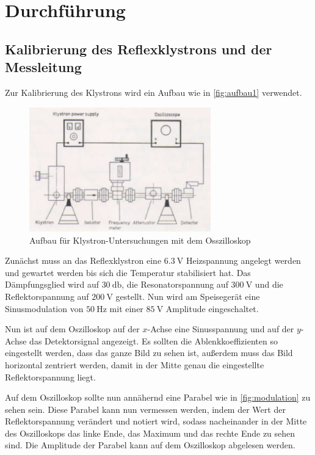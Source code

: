 \section{Durchführung}
\label{sec:Durchführung}

\subsection{Kalibrierung des Reflexklystrons und der Messleitung}
\label{ssec:Kalibrierung}

Zur Kalibrierung des Klystrons wird ein Aufbau wie in \autoref{fig:aufbau1} verwendet.

\begin{figure}
    \centering
    \includegraphics[width=0.7\textwidth]{images/aufbau1.png}
    \caption{Aufbau für Klystron-Untersuchungen mit dem Osszilloskop \cite{V53_old}}
    \label{fig:aufbau1}
\end{figure}

Zunächst muss an das Reflexklystron eine $\SI{6.3}{\volt}$ Heizspannung angelegt werden und gewartet werden bis sich die Temperatur stabilisiert hat.
Das Dämpfungsglied wird auf $\SI{30}{\decibel}$, die Resonatorspannung auf $\SI{300}{\volt}$ und die Reflektorspannung auf $\SI{200}{\volt}$ gestellt.
Nun wird am Speisegerät eine Sinusmodulation von $\SI{50}{\hertz}$ mit einer $\SI{85}{\volt}$ Amplitude eingeschaltet.

Nun ist auf dem Oszilloskop auf der $x$-Achse eine Sinusspannung und auf der $y$-Achse das Detektorsignal angezeigt.
Es sollten die Ablenkkoeffizienten so eingestellt werden, dass das ganze Bild zu sehen ist, 
außerdem muss das Bild horizontal zentriert werden, damit in der Mitte genau die eingestellte Reflektorspannung liegt.

Auf dem Oszilloskop sollte nun annähernd eine Parabel wie in \autoref{fig:modulation} zu sehen sein.
Diese Parabel kann nun vermessen werden, indem der Wert der Reflektorspannung verändert und notiert wird, 
sodass nacheinander in der Mitte des Oszilloskops das linke Ende, das Maximum und das rechte Ende zu sehen sind.
Die Amplitude der Parabel kann auf dem Oszilloskop abgelesen werden.

